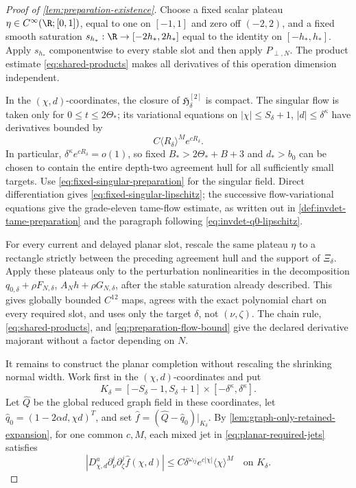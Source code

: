 \begin{proof}[Proof of \cref{lem:preparation-existence}]
Choose a fixed scalar plateau \(\eta\in C^\infty(\R;[0,1])\), equal to one
on \([-1,1]\) and zero off \((-2,2)\), and a fixed smooth saturation
\(s_{h_*}:\R\to[-2h_*,2h_*]\) equal to the identity on
\([-h_*,h_*]\).  Apply \(s_{h_*}\) componentwise to every stable slot and
then apply \(P_{\perp,N}\).  The product estimate
\cref{eq:shared-products} makes all derivatives of this operation
dimension independent.

In the \((\chi,d)\)-coordinates, the closure of
\(\mathfrak H^{[2]}_\delta\) is compact.  The singular flow is taken only for
\(0\le t\le2\Theta_*\); its variational equations on
\(|\chi|\le S_\delta+1\), \(|d|\le\delta^\kappa\) have derivatives bounded by
\begin{equation}
 C\langle R_\delta\rangle^M e^{cR_\delta}.             \label{eq:preparation-flow-bound}
\end{equation}
In particular,
\(\delta^\kappa e^{cR_\delta}=o(1)\), so fixed
\(B_*>2\Theta_*+B+3\) and \(d_*>b_0\) can be chosen to contain the entire
depth-two agreement hull for all sufficiently small targets.  Use
\cref{eq:fixed-singular-preparation} for the singular field.  Direct
differentiation gives \cref{eq:fixed-singular-lipschitz}; the successive
flow-variational equations give the grade-eleven tame-flow estimate, as
written out in \cref{def:invdet-tame-preparation} and the paragraph following
\cref{eq:invdet-q0-lipschitz}.

For every current and delayed planar slot, rescale the same plateau \(\eta\)
to a rectangle strictly between the preceding agreement hull and the support
of \(\Xi_\delta\).  Apply these plateaus only to the perturbation
nonlinearities in the decomposition
\(q_{0,\delta}+\rho F_{N,\delta}\),
\(A_Nh+\rho G_{N,\delta}\), after the stable saturation already described.
This gives globally bounded \(C^{12}\) maps, agrees with the exact polynomial
chart on every required slot, and uses only the target \(\delta\), not
\((\nu,\zeta)\).  The chain rule, \cref{eq:shared-products}, and
\cref{eq:preparation-flow-bound} give the declared derivative majorant
without a factor depending on \(N\).

It remains to construct the planar completion without rescaling the
shrinking normal width.  Work first in the \((\chi,d)\)-coordinates and put
\[
 K_\delta=[-S_\delta-1,S_\delta+1]
              \times[-\delta^\kappa,\delta^\kappa].
\]
Let \(\widehat Q\) be the global reduced graph field in these coordinates,
let \(\widehat q_0=(1-2\alpha d,\chi d)^T\), and set
\(\widehat f=(\widehat Q-\widehat q_0)|_{K_\delta}\).
By \cref{lem:graph-only-retained-expansion}, for one common \(c,M\), each
mixed jet in \cref{eq:planar-required-jets} satisfies
\begin{equation}
 |D_{\chi,d}^a\partial_\nu^i\partial_\zeta^j\widehat f(\chi,d)|
 \le C\delta^{\omega_{ij}}
       e^{c|\chi|}\langle\chi\rangle^M
 \quad\text{on }K_\delta.                            \label{eq:thin-rectangle-data-bound}
\end{equation}


\end{proof}
